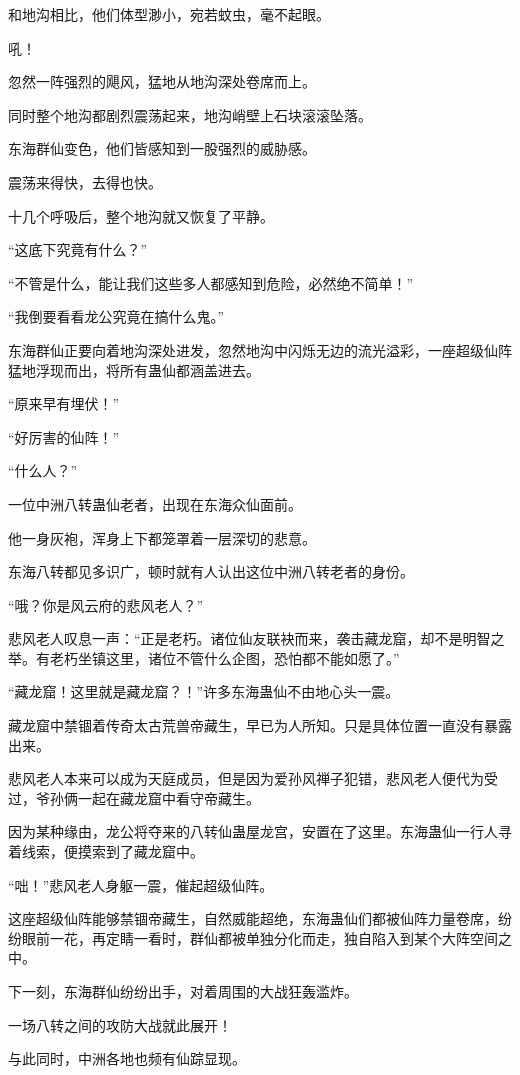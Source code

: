 \begin{this_body}
和地沟相比，他们体型渺小，宛若蚊虫，毫不起眼。

吼！

忽然一阵强烈的飓风，猛地从地沟深处卷席而上。

同时整个地沟都剧烈震荡起来，地沟峭壁上石块滚滚坠落。

东海群仙变色，他们皆感知到一股强烈的威胁感。

震荡来得快，去得也快。

十几个呼吸后，整个地沟就又恢复了平静。

“这底下究竟有什么？”

“不管是什么，能让我们这些多人都感知到危险，必然绝不简单！”

“我倒要看看龙公究竟在搞什么鬼。”

东海群仙正要向着地沟深处进发，忽然地沟中闪烁无边的流光溢彩，一座超级仙阵猛地浮现而出，将所有蛊仙都涵盖进去。

“原来早有埋伏！”

“好厉害的仙阵！”

“什么人？”

一位中洲八转蛊仙老者，出现在东海众仙面前。

他一身灰袍，浑身上下都笼罩着一层深切的悲意。

东海八转都见多识广，顿时就有人认出这位中洲八转老者的身份。

“哦？你是风云府的悲风老人？”

悲风老人叹息一声：“正是老朽。诸位仙友联袂而来，袭击藏龙窟，却不是明智之举。有老朽坐镇这里，诸位不管什么企图，恐怕都不能如愿了。”

“藏龙窟！这里就是藏龙窟？！”许多东海蛊仙不由地心头一震。

藏龙窟中禁锢着传奇太古荒兽帝藏生，早已为人所知。只是具体位置一直没有暴露出来。

悲风老人本来可以成为天庭成员，但是因为爱孙风禅子犯错，悲风老人便代为受过，爷孙俩一起在藏龙窟中看守帝藏生。

因为某种缘由，龙公将夺来的八转仙蛊屋龙宫，安置在了这里。东海蛊仙一行人寻着线索，便摸索到了藏龙窟中。

“咄！”悲风老人身躯一震，催起超级仙阵。

这座超级仙阵能够禁锢帝藏生，自然威能超绝，东海蛊仙们都被仙阵力量卷席，纷纷眼前一花，再定睛一看时，群仙都被单独分化而走，独自陷入到某个大阵空间之中。

下一刻，东海群仙纷纷出手，对着周围的大战狂轰滥炸。

一场八转之间的攻防大战就此展开！

与此同时，中洲各地也频有仙踪显现。


\end{this_body}
